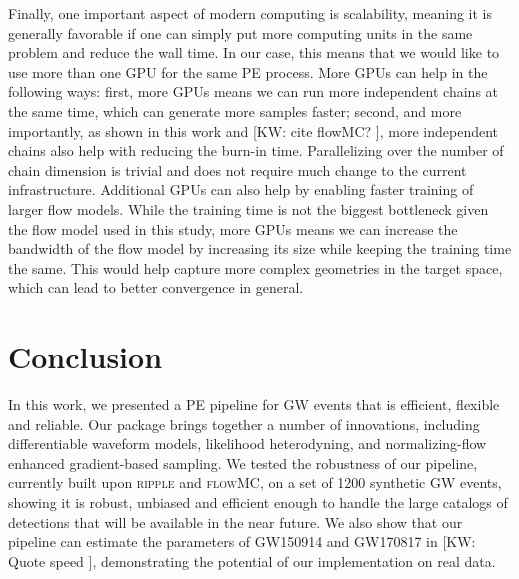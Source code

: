 \documentclass[twocolumn]{aastex631}
\newcommand{\kw}[1]{{\color{rb4}[KW: #1 ]}}
\begin{document}
Finally, one important aspect of modern computing is scalability, meaning it is
generally favorable if one can simply put more computing units in the same
problem and reduce the wall time. In our case, this means that we would like to
use more than one GPU for the same PE process. More GPUs can help in the
following ways: first, more GPUs means we can run more independent chains at
the same time, which can generate more samples faster; second, and more
importantly, as shown in this work and \kw{cite flowMC?}, more independent
chains also help with reducing the burn-in time. Parallelizing over the number
of chain dimension is trivial and does not require much change to the current
infrastructure. Additional GPUs can also help by enabling faster training of
larger flow models. While the training time is not the biggest bottleneck given
the flow model used in this study, more GPUs means we can increase the
bandwidth of the flow model by increasing its size while keeping the training
time the same. This would help capture more complex geometries in the target
space, which can lead to better convergence in general.

\section{Conclusion}

In this work, we presented a PE pipeline for GW events that is efficient,
flexible and reliable. Our package brings together a number of innovations,
including differentiable waveform models, likelihood heterodyning, and
normalizing-flow enhanced gradient-based sampling. We tested the robustness of
our pipeline, currently built upon \textsc{ripple} and \textsc{flowMC}, on a
set of 1200 synthetic GW events, showing it is robust, unbiased and efficient
enough to handle the large catalogs of detections that will be available in the
near future. We also show that our pipeline can estimate the parameters of
GW150914 and GW170817 in \kw{Quote speed}, demonstrating the potential of our
implementation on real data.
\end{document}

